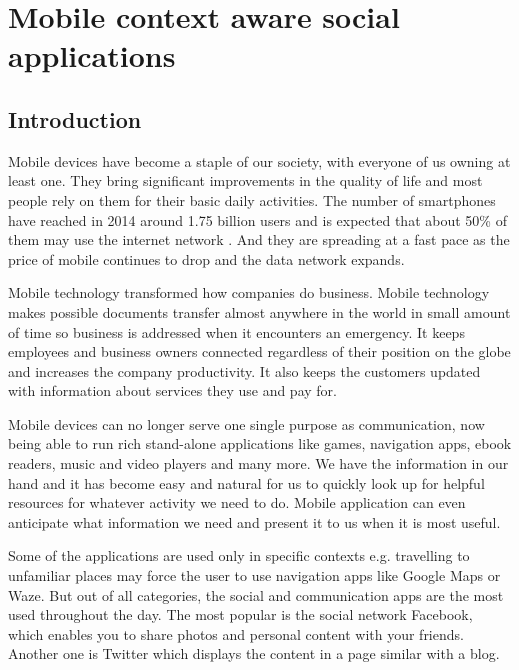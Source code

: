 
\chapter{Mobile context aware social applications}\label{chap1}


\section{Introduction}

Mobile devices have become a staple of our society, with everyone of
us owning at least one. They bring significant improvements in the quality of
life and most people rely on them for their basic daily activities.
The number of smartphones have reached in 2014 around 1.75 billion users and is
expected that about 50\% of them may use the internet network \cite{emarketer}.
And they are spreading at a fast pace as the price of mobile continues to drop
and the data network expands.

Mobile technology transformed how companies do business. Mobile technology makes
possible documents transfer almost anywhere in the world in small amount of time
so business is addressed when it encounters an emergency. It keeps employees and
business owners connected regardless of their position on the globe and
increases the company productivity. It also keeps the customers updated with
information about services they use and pay for.

Mobile devices can no longer serve one single purpose as communication, now
being able to run rich stand-alone applications like games, navigation apps,
ebook readers, music and video players and many more. We have the information
in our hand and it has become easy and natural for us to quickly look up for
helpful resources for whatever activity we need to do. Mobile application can
even anticipate what information we need and present it to us when it is most
useful.

Some of the applications are used only in specific contexts e.g. travelling to
unfamiliar places may force the user to use navigation apps like Google Maps or
Waze. But out of all categories, the social and communication apps are the most
used throughout the day. The most popular is the social network Facebook, which
enables you to share photos and personal content with your friends. Another one
is Twitter which displays the content in a page similar with a blog.

